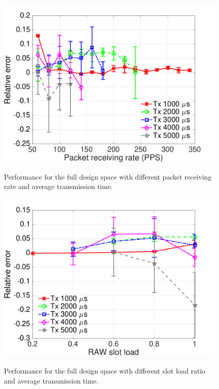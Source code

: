 
 \begin{figure}[t]
    \centering
{\includegraphics[width=0.8\columnwidth]{figures/avg_result_Prate_tx_extend_08}}
  \caption{Performance for the full design space with different packet receiving rate and average transmission time. \label{fig:results-extended-prate}}
\end{figure}


 \begin{figure}[t]
    \centering
{\includegraphics[width=0.8\columnwidth]{figures/avg_result_load_tx_extended_08}}
  \caption{Performance for the full design space with different slot load ratio and average transmission time. \label{fig:results-extended-load}}
\end{figure}


